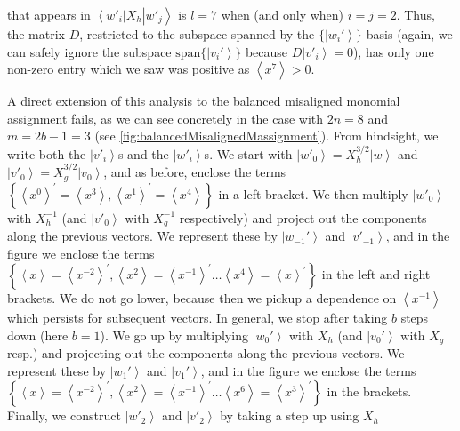 \documentclass{theoretics}
\begin{document}
that appears in $\left\langle w'_{i}\right|X_{h}\left|w'_{j}\right\rangle $
is $l=7$ when (and only when) $i=j=2$. Thus, the matrix $D$, restricted
to the subspace spanned by the $\{\left|w_{i}'\right\rangle \}$ basis
(again, we can safely ignore the subspace $\text{span}\{\left|v_{i}'\right\rangle \}$
because $D\left|v'_{i}\right\rangle =0$), has only one non-zero entry
which we saw was positive as $\left\langle x^{7}\right\rangle >0$.

A direct extension of this analysis to the balanced
misaligned monomial assignment fails, as we can see concretely in the case with $2n=8$ and
$m=2b-1=3$ (see  \cref{fig:balancedMisalignedMassignment}). From hindsight,
we write both the $\left|v'_{i}\right\rangle $s and the $\left|w'_{i}\right\rangle $s.
We start with $\left|w'_{0}\right\rangle =X_{h}^{3/2}\left|w\right\rangle $
and $\left|v'_{0}\right\rangle =X_{g}^{3/2}\left|v_{0}\right\rangle $,
and as before, enclose the terms $\left\{ \left\langle x^{0}\right\rangle ^{\prime}=\left\langle x^{3}\right\rangle ,\left\langle x^{1}\right\rangle ^{\prime}=\left\langle x^{4}\right\rangle \right\} $
in a left bracket. We then multiply $\left|w'_{0}\right\rangle $
with $X_{h}^{-1}$ (and $\left|v'_{0}\right\rangle $ with $X_{g}^{-1}$
respectively) and project out the components along the previous
vectors. We represent these by $\left|w_{-1}'\right\rangle $ and
$\left|v'_{-1}\right\rangle $, and in the figure we enclose the terms
$\left\{ \left\langle x\right\rangle =\left\langle x^{-2}\right\rangle ^{\prime},\left\langle x^{2}\right\rangle =\left\langle x^{-1}\right\rangle ^{\prime}\dots\left\langle x^{4}\right\rangle =\left\langle x\right\rangle ^{\prime}\right\} $
in the left and right brackets. We do not go lower, because then we
pickup a dependence on $\left\langle x^{-1}\right\rangle $ which persists for subsequent vectors. In general, we stop after taking
$b$ steps down (here $b=1$). We go up by multiplying $\left|w_{0}'\right\rangle $ with $X_{h}$ (and $\left|v_{0}'\right\rangle $
with $X_{g}$ resp.) and projecting out the components along the previous
vectors. We represent these by $\left|w_{1}'\right\rangle $ and  $\left|v_{1}'\right\rangle $, and in
the figure we enclose the terms $\left\{ \left\langle x\right\rangle =\left\langle x^{-2}\right\rangle ^{\prime},\left\langle x^{2}\right\rangle =\left\langle x^{-1}\right\rangle ^{\prime}\dots\left\langle x^{6}\right\rangle =\left\langle x^{3}\right\rangle ^{\prime}\right\} $
in the brackets. Finally, we construct $\left|w'_{2}\right\rangle $
and $\left|v'_{2}\right\rangle $ by taking a step up using $X_{h}$
\end{document}
